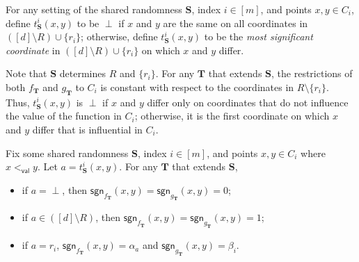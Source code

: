 \documentclass{toc}
\newcommand{\bS}{\ensuremath{\mathbf{S}}}
\newcommand{\bT}{\ensuremath{\mathbf{T}}}
\newcommand{\order}{\ensuremath{<_\dec}}
\newcommand{\coord}[2]{t^{#1}_{#2}}
\newcommand{\dec}{\mathsf{val}}
\newcommand{\sgn}{\mathsf{sgn}}
\begin{document}
\begin{definition} \label{def:t}
For any setting of the shared randomness $\bS$,
index %
$i \in [m]$, and points $x,y \in C_i$, define $\coord{i}{\bS}(x,y)$
to be $\perp$ if $x$ and $y$ are the same on all coordinates in $([d] \setminus R) \cup \{r_i\}$; otherwise, define $\coord{i}{\bS}(x,y)$ to be the \emph{most significant coordinate}
in $([d] \setminus R) \cup \{r_i\}$ on which $x$ and $y$ differ.
\end{definition}

Note that $\bS$ determines $R$ and $\{r_i\}$.
For any $\bT$ that extends $\bS$, the restrictions of both $f_{\bT}$ and $g_{\bT}$ to $C_i$ is constant with respect to the coordinates in $R \setminus \{r_i\}$.
Thus, $\coord{i}{\bS}(x,y)$ is $\perp$ if $x$ and $y$ differ only on coordinates that do not influence the value of the function in $C_i$; otherwise, it is the first coordinate on which $x$ and $y$ differ that is influential
in $C_i$.

\begin{claim}\label{clm:interesting}
Fix some shared randomness $\bS$, 
index %
$i \in [m]$, and points $x,y \in C_i$ where $x \order y$.
Let $a = \coord{i}{\bS}(x,y)$.
For any $\bT$ that extends $\bS$,
\begin{itemize}
    \item if $a = \perp$, then $\sgn_{f_{\bT}}(x,y) = \sgn_{g_{\bT}}(x,y) = 0$;
    \item if $a \in ([d] \setminus R)$, then $\sgn_{f_{\bT}}(x,y) = \sgn_{g_{\bT}}(x,y) = 1$;
    \item if $a = r_i$, $\sgn_{f_{\bT}}(x,y) = \alpha_{a}$ and $\sgn_{g_{\bT}}(x,y) = \beta_i$.
\end{itemize}
\end{claim}
\end{document}
